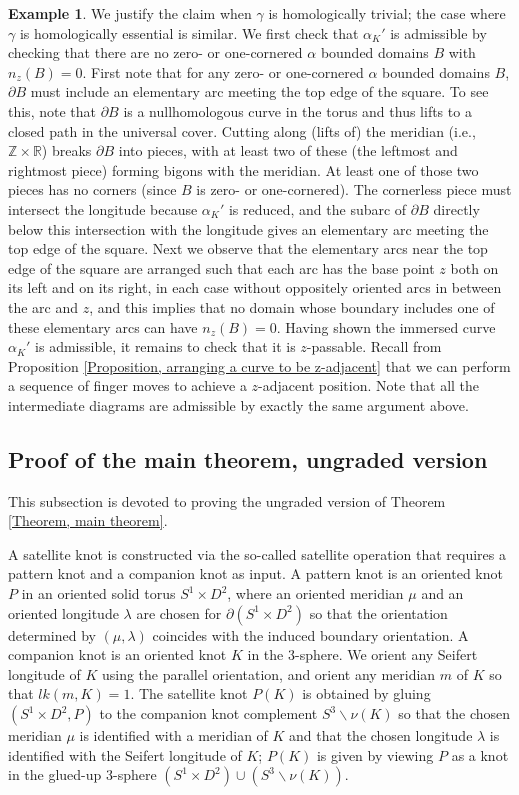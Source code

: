 \documentclass{amsart}
\theoremstyle{definition}
\newtheorem{exam}[thm]{Example}
\theoremstyle{remark}
\numberwithin{equation}{section}
\numberwithin{equation}{section} \makeatletter
\begin{document}
\begin{exam}
	We justify the claim when $\gamma$ is homologically trivial; the case where $\gamma$ is homologically essential is similar. We first check that $\alpha_K'$ is admissible by checking that there are no zero- or one-cornered $\alpha$ bounded domains $B$ with $n_z(B) = 0$. First note that for any  zero- or one-cornered $\alpha$ bounded domains $B$, $\partial B$ must include an elementary arc meeting the top edge of the square. To see this, note that $\partial B$ is a nullhomologous curve in the torus and thus lifts to a closed path in the universal cover. Cutting along (lifts of) the meridian (i.e., $\mathbb{Z}\times \mathbb{R}$) breaks $\partial B$ into pieces, with at least two of these (the leftmost and rightmost piece) forming bigons with the meridian. At least one of those two pieces has no corners (since $B$ is zero- or one-cornered). The cornerless piece must intersect the longitude because $\alpha_K'$ is reduced, and the subarc of $\partial B$ directly below this intersection with the longitude gives an elementary arc meeting the top edge of the square. Next we observe that the elementary arcs near the top edge of the square are arranged such that each arc has the base point $z$ both on its left and on its right, in each case without oppositely oriented arcs in between the arc and $z$, and this implies that no domain whose boundary includes one of these elementary arcs can have $n_z(B) = 0$.
	Having shown the immersed curve $\alpha_K'$ is admissible, it remains to check that it is $z$-passable. Recall from Proposition \ref{Proposition, arranging a curve to be z-adjacent} that we can perform a sequence of finger moves to achieve a $z$-adjacent position. Note that all the intermediate diagrams are admissible by exactly the same argument above.  
\end{exam}


\subsection{Proof of the main theorem, ungraded version}\label{Subsection, proof of the main theorem, ungraded version}
This subsection is devoted to proving the ungraded version of Theorem \ref{Theorem, main theorem}.   

A satellite knot is constructed via the so-called satellite operation that requires a pattern knot and a companion knot as input. A pattern knot is an oriented knot $P$ in an oriented solid torus $S^1\times D^2$, where an oriented meridian $\mu$ and an oriented longitude $\lambda$ are chosen for $\partial (S^1\times D^2)$ so that the orientation determined by $(\mu,\lambda)$ coincides with the induced boundary orientation. A companion knot is an oriented knot $K$ in the 3-sphere. We orient any Seifert longitude of $K$ using the parallel orientation, and orient any meridian $m$ of $K$ so that $lk(m,K)=1$. The satellite knot $P(K)$ is obtained by gluing $(S^1\times D^2, P)$ to the companion knot complement $S^3\backslash \nu(K)$ so that the chosen meridian $\mu$ is identified with a meridian of $K$ and that the chosen longitude $\lambda$ is identified with the Seifert longitude of $K$; $P(K)$ is given by viewing $P$ as a knot in the glued-up 3-sphere $(S^1\times D^2)\cup (S^3\backslash\nu(K))$.   
 
\end{document}

